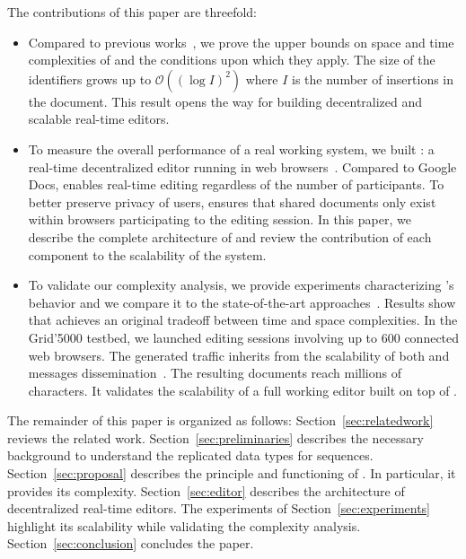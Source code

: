 \noindent The contributions of this paper are threefold:
\begin{itemize}
\item Compared to previous works~\cite{nedelec2013concurrency, nedelec2013lseq},
  we prove the upper bounds on space and time complexities of \LSEQ and the
  conditions upon which they apply. The size of the identifiers grows up to
  $\mathcal{O}((\log I)^2)$ where $I$ is the number of insertions in the
  document. This result opens the way for building decentralized and scalable
  real-time editors.
\item To measure the overall performance of a real working system, we built
  \CRATE: a real-time decentralized editor running in web
  browsers~\cite{nedelec2016crate}. Compared to Google Docs, \CRATE enables
  real-time editing regardless of the number of participants. To better preserve
  privacy of users, \CRATE ensures that shared documents only exist within
  browsers participating to the editing session. In this paper, we describe the
  complete architecture of \CRATE and review the contribution of each component
  to the scalability of the system. %
\item To validate our complexity analysis, we provide experiments characterizing
  \LSEQ's behavior and we compare it to the state-of-the-art
  approaches~\cite{preguica2009commutative, weiss2009logoot}. Results show that
  \LSEQ achieves an original tradeoff between time and space complexities. In
  the Grid'5000 testbed, we launched \CRATE editing sessions involving up to 600
  connected web browsers. The generated traffic inherits from the scalability of
  both \LSEQ and messages dissemination~\cite{nedelec2015spray}. The resulting
  documents reach millions of characters. It validates the scalability of a full
  working editor built on top of \LSEQ.
\end{itemize}

The remainder of this paper is organized as follows:
Section~\ref{sec:relatedwork} reviews the related work.
Section~\ref{sec:preliminaries} describes the necessary background to understand
the replicated data types for sequences. Section~\ref{sec:proposal} describes
the principle and functioning of \LSEQ. In particular, it provides its
complexity. Section~\ref{sec:editor} describes the architecture of decentralized
real-time editors. The experiments of Section~\ref{sec:experiments} highlight
its scalability while validating the complexity analysis.
Section~\ref{sec:conclusion} concludes the paper.

